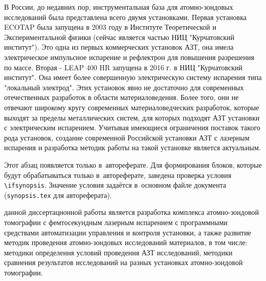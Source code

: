В России, до недавних пор, инструментальная база для атомно-зондовых исследований была представлена всего двумя установками. Первая установка ECOTAP была запущена в 2003 году в Институте Теоретической и Экспериментальной физики (сейчас является частью НИЦ "Курчатовский институт"). Это одна из первых коммерческих установок АЗТ, она имела электрическое импульсное испарение и рефлектрон для повышения разрешения по массе. Вторая - LEAP 400 HR запущена в 2016 г. в НИЦ "Курчатовский институт". Она имеет более совершенную электрическую систему испарения типа "локальный электрод". Этих установок явно не достаточно для современных отечественных разработок в области материаловедения. Более того, они не отвечают широкому кругу современных материаловедческих разработок, которые выходят за пределы металлических систем, для которых подходят АЗТ установки с электрическим испарением. Учитывая имеющиеся ограничения поставок такого рода установок, создание современной Российской установки АЗТ с лазерным испарения и разработка методик работы на такой установке является актуальным.

\ifsynopsis
Этот абзац появляется только в~автореферате.
Для формирования блоков, которые будут обрабатываться только в~автореферате,
заведена проверка условия \verb!\!\verb!ifsynopsis!.
Значение условия задаётся в~основном файле документа (\verb!synopsis.tex! для
автореферата).
\else
\fi


{\aim} данной диссертационной работы является разработка комплекса атомно-зондовой томографии с фемтосекундным лазерным испарением с программными средствами автоматизации управления и контроля установки, а также развитие методик проведения атомно-зондовых исследований материалов, в том числе: методики определения условий проведения АЗТ исследований, методики сравнения результатов исследований на разных установках атомно-зондовой томографии.

